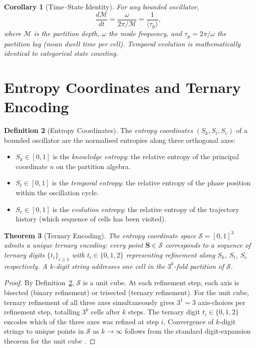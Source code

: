 \documentclass[11pt,a4paper]{article}
\theoremstyle{thmstyle}
\newtheorem{theorem}{Theorem}[section]
\newtheorem{corollary}[theorem]{Corollary}
\theoremstyle{axiomstyle}
\theoremstyle{definition}
\newtheorem{definition}[theorem]{Definition}
\theoremstyle{remark}
\newcommand{\Sk}{S_{k}}
\newcommand{\St}{S_{t}}
\newcommand{\Se}{S_{e}}
\newcommand{\Sspace}{\mathcal{S}}
\newcommand{\Depth}{\mathcal{M}}
\newcommand{\Lag}{\tau_{\mathrm{p}}}
\begin{document}
\begin{corollary}[Time--State Identity]\label{cor:timestate}
For any bounded oscillator,
\begin{equation}
\frac{d\Depth}{dt}=\frac{\omega}{2\pi/\Depth}=\frac{1}{\langle\Lag\rangle},
\end{equation}
where $\Depth$ is the partition depth, $\omega$ the mode frequency, and $\Lag=2\pi/\omega$ the partition lag (mean dwell time per cell). Temporal evolution is mathematically identical to categorical state counting.
\end{corollary}

\section{Entropy Coordinates and Ternary Encoding}
\label{sec:entropy}

\begin{definition}[Entropy Coordinates]\label{def:scoords}
The \emph{entropy coordinates} $(\Sk,\St,\Se)$ of a bounded oscillator are the normalised entropies along three orthogonal axes:
\begin{itemize}[nosep]
\item $\Sk\in[0,1]$ is the \emph{knowledge entropy}: the relative entropy of the principal coordinate $n$ on the partition algebra.
\item $\St\in[0,1]$ is the \emph{temporal entropy}: the relative entropy of the phase position within the oscillation cycle.
\item $\Se\in[0,1]$ is the \emph{evolution entropy}: the relative entropy of the trajectory history (which sequence of cells has been visited).
\end{itemize}
\end{definition}

\begin{theorem}[Ternary Encoding]\label{thm:ternary}
The entropy coordinate space $\Sspace=[0,1]^{3}$ admits a unique ternary encoding: every point $\bm{S}\in\Sspace$ corresponds to a sequence of ternary digits $\{t_{i}\}_{i\geq 1}$ with $t_{i}\in\{0,1,2\}$ representing refinement along $\Sk$, $\St$, $\Se$ respectively. A $k$-digit string addresses one cell in the $3^{k}$-fold partition of $\Sspace$.
\end{theorem}

\begin{proof}
By Definition~\ref{def:scoords}, $\Sspace$ is a unit cube. At each refinement step, each axis is bisected (binary refinement) or trisected (ternary refinement). For the unit cube, ternary refinement of all three axes simultaneously gives $3^{1}=3$ axis-choices per refinement step, totalling $3^{k}$ cells after $k$ steps. The ternary digit $t_{i}\in\{0,1,2\}$ encodes which of the three axes was refined at step $i$. Convergence of $k$-digit strings to unique points in $\Sspace$ as $k\to\infty$ follows from the standard digit-expansion theorem for the unit cube \citep{rudin1987}.
\end{proof}
\end{document}
